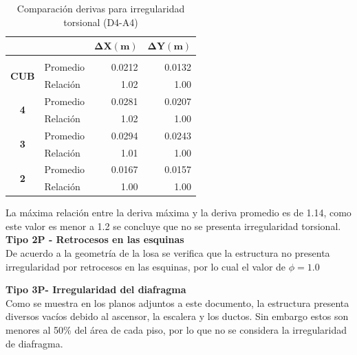 \documentclass[12pt]{article}
\begin{document}
\begin{table}[H]
  \centering
    \begin{tabular}{|c|l|r|r|}
\cline{3-4}    \multicolumn{1}{r}{} &     & \multicolumn{1}{c|}{\cellcolor[rgb]{ .2,  .247,  .31}\textcolor[rgb]{ 1,  1,  1}{\textbf{$\mathbf{\Delta X (m)}$}}} & \multicolumn{1}{c|}{\cellcolor[rgb]{ .2,  .247,  .31}\textcolor[rgb]{ 1,  1,  1}{\textbf{$\mathbf{\Delta Y (m)}$}}} \bigstrut\\
    \hline
    \rowcolor[rgb]{ .2,  .247,  .31} \multicolumn{4}{|c|}{\textcolor[rgb]{ 1,  1,  1}{\textbf{D4-A4}}} \bigstrut\\
    \hline
    \multirow{2}[4]{*}{\textbf{CUB}} & Promedio & 0.0212 & 0.0132 \bigstrut\\
\cline{2-4}        & Relación & 1.02 & 1.00 \bigstrut\\
    \hline
    \multirow{2}[4]{*}{\textbf{4}} & Promedio & 0.0281 & 0.0207 \bigstrut\\
\cline{2-4}        & Relación & 1.02 & 1.00 \bigstrut\\
    \hline
    \multirow{2}[4]{*}{\textbf{3}} & Promedio & 0.0294 & 0.0243 \bigstrut\\
\cline{2-4}        & Relación & 1.01 & 1.00 \bigstrut\\
    \hline
    \multirow{2}[4]{*}{\textbf{2}} & Promedio & 0.0167 & 0.0157 \bigstrut\\
\cline{2-4}        & Relación & 1.00 & 1.00 \bigstrut\\
    \hline
    \end{tabular}%
    \caption{Comparación derivas para irregularidad torsional (D4-A4)}
  \label{tab:D4-A4}%
\end{table}%

La máxima relación entre la deriva máxima y la deriva promedio es de 1.14, como este valor es menor a 1.2 se concluye que no se presenta irregularidad torsional.\\

\textbf{Tipo 2P - Retrocesos en las esquinas}\\

De acuerdo a la geometría de la losa se verifica que la estructura no presenta irregularidad por retrocesos en las esquinas, por lo cual el valor de $\phi=1.0$

\textbf{Tipo 3P- Irregularidad del diafragma }\\

Como se muestra en los planos adjuntos a este documento, la estructura presenta diversos vacíos debido al ascensor, la escalera y los ductos. Sin embargo estos son menores al 50\% del área de cada piso, por lo que no se considera la irregularidad de diafragma.
\end{document}
